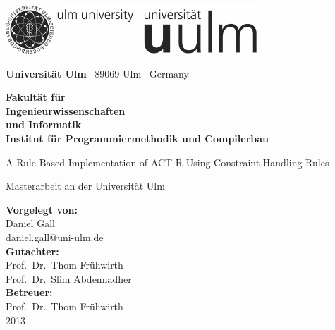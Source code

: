 \documentclass[
    a4paper,
    10pt,
    bibliography=totoc,
    twoside,
    openright,
    numbers=noenddot,
    headings=normal,
    DIV=9,
    parskip
]{scrbook}
\makeatletter
\newcommand{\fullname}{Daniel Gall}
\newcommand{\email}{daniel.gall@uni-ulm.de}
\newcommand{\titel}{A Rule-Based Implementation of ACT-R Using Constraint Handling Rules}
\newcommand{\jahr}{2013}
\newcommand{\gutachterA}{Prof.\ Dr.\ Thom Frühwirth}
\newcommand{\gutachterB}{Prof.\ Dr.\ Slim Abdennadher}
\newcommand{\betreuer}{Prof.\ Dr.\ Thom Frühwirth}
\newcommand{\fakultaet}{Ingenieurwissenschaften\\und Informatik}
\newcommand{\institut}{Institut für Programmiermethodik und Compilerbau}
\newcommand{\arbeit}{Masterarbeit}
\makeatother
\begin{document}
\frontmatter


\thispagestyle{empty}
\begin{addmargin*}[4mm]{-32mm}
    \includegraphics[height=1.8cm]{images/unilogo_bild}
    \hfill
    \includegraphics[height=1.8cm]{images/unilogo_wort}
    \vspace*{2.1em}

    \footnotesize
    \textbf{Universität Ulm} \textbar ~89069 Ulm \textbar ~Germany
    \hfill
    \parbox[t]{42mm}{\bfseries Fakultät für\\\fakultaet\\\mdseries\institut}
    \vspace*{2cm}

    \parbox{140mm}{\bfseries \raggedright \huge \titel}

    {\arbeit{} an der Universität Ulm}
    \vspace*{4em}

    \textbf{Vorgelegt von:}\\\fullname\\\email\\[2em]
    \textbf{Gutachter:}\\\gutachterA\\\gutachterB\\[2em]
    \textbf{Betreuer:}\\\betreuer\\[1.5em]
    \jahr
\end{addmargin*}
\end{document}
